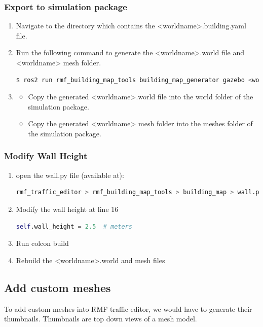 \documentclass[11pt]{article}
\begin{document}
\subsubsection{Export to simulation package}
\begin{enumerate}
 \item {Navigate to the directory which contains the <worldname>.building.yaml file.}
 \item {
       Run the following command to generate the <worldname>.world file and <worldname> mesh folder.
       \begin{lstlisting}[language=bash]
        $ ros2 run rmf_building_map_tools building_map_generator gazebo <worldname>.building.yaml <worldname>.world .
        \end{lstlisting}
       }
 \item {
       \begin{itemize}
        \item {
              Copy the generated <worldname>.world file into the world folder of the simulation package.
              }
        \item {
              Copy the generated <worldname> mesh folder into the meshes folder of the simulation package.
              }
       \end{itemize}
       }
\end{enumerate}
\subsubsection{Modify Wall Height}
\begin{enumerate}
 \item {open the wall.py file (available at):
       \begin{lstlisting}[language=bash]
         rmf_traffic_editor > rmf_building_map_tools > building_map > wall.py
        \end{lstlisting}
       }
 \item {
       Modify the wall height at line 16
       \begin{lstlisting}[language=python]
        self.wall_height = 2.5  # meters
        \end{lstlisting}
       }
 \item {Run colcon build}
 \item{
       Rebuild the <worldname>.world and mesh files
       }
\end{enumerate}
\subsection{Add custom meshes}
To add custom meshes into RMF traffic editor, we would have to generate their thumbnails. Thumbnails are top down views of a mesh model.
\end{document}
